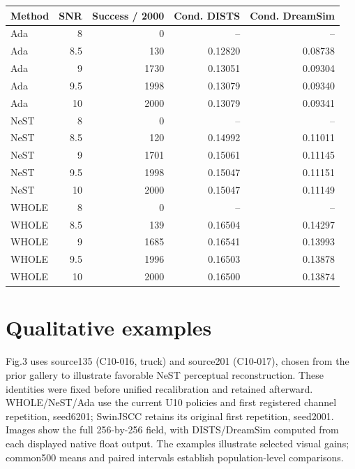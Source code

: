 \documentclass[10pt,letterpaper]{article}
\begin{document}
\begin{longtable}{@{}lrrrr@{}}\toprule
Method & SNR & Success / 2000 & Cond. DISTS & Cond. DreamSim\\\midrule\endhead
Ada & 8 & 0 & -- & --\\
Ada & 8.5 & 130 & 0.12820 & 0.08738\\
Ada & 9 & 1730 & 0.13051 & 0.09304\\
Ada & 9.5 & 1998 & 0.13079 & 0.09340\\
Ada & 10 & 2000 & 0.13079 & 0.09341\\
NeST & 8 & 0 & -- & --\\
NeST & 8.5 & 120 & 0.14992 & 0.11011\\
NeST & 9 & 1701 & 0.15061 & 0.11145\\
NeST & 9.5 & 1998 & 0.15047 & 0.11151\\
NeST & 10 & 2000 & 0.15047 & 0.11149\\
WHOLE & 8 & 0 & -- & --\\
WHOLE & 8.5 & 139 & 0.16504 & 0.14297\\
WHOLE & 9 & 1685 & 0.16541 & 0.13993\\
WHOLE & 9.5 & 1996 & 0.16503 & 0.13878\\
WHOLE & 10 & 2000 & 0.16500 & 0.13874\\
\bottomrule\end{longtable}


\section{Qualitative examples}\label{sup:6}
Fig.3 uses source135 (C10-016, truck) and source201 (C10-017), chosen from the prior gallery to illustrate favorable NeST perceptual reconstruction. These identities were fixed before unified recalibration and retained afterward. WHOLE/NeST/Ada use the current U10 policies and first registered channel repetition, seed6201; SwinJSCC retains its original first repetition, seed2001. Images show the full 256-by-256 field, with DISTS/DreamSim computed from each displayed native float output. The examples illustrate selected visual gains; common500 means and paired intervals establish population-level comparisons.
\end{document}
